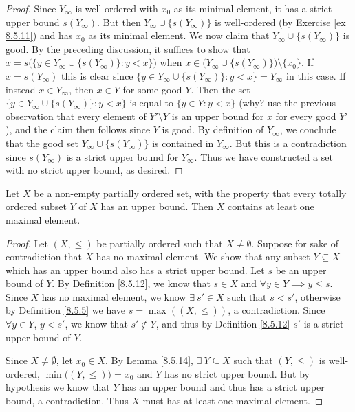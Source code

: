 \begin{proof}
    Since \(Y_{\infty}\) is well-ordered with \(x_0\) as its minimal element, it has a strict upper bound \(s(Y_{\infty})\).
    But then \(Y_{\infty} \cup \{s(Y_{\infty})\}\) is well-ordered (by Exercise \ref{ex 8.5.11}) and has \(x_0\) as its minimal element.
    We now claim that \(Y_{\infty} \cup \{s(Y_{\infty})\}\) is good.
    By the preceding discussion, it suffices to show that \(x = s\big(\big\{y \in Y_{\infty} \cup \{s(Y_{\infty})\} : y < x\big\}\big)\) when \(x \in \big(Y_{\infty} \cup \{s(Y_{\infty})\}\big) \setminus \{x_0\}\).
    If \(x = s(Y_{\infty})\) this is clear since \(\big\{y \in Y_{\infty} \cup \{s(Y_{\infty})\} : y < x\big\} = Y_{\infty}\) in this case.
    If instead \(x \in Y_{\infty}\), then \(x \in Y\) for some good \(Y\).
    Then the set \(\big\{y \in Y_{\infty} \cup \{s(Y_{\infty})\}: y < x\big\}\) is equal to \(\{y \in Y : y < x\}\)
    (why? use the previous observation that every element of \(Y' \setminus Y\) is an upper bound for \(x\) for every good \(Y'\)), and the claim then follows since \(Y\) is good.
    By definition of \(Y_{\infty}\), we conclude that the good set \(Y_{\infty} \cup \{s(Y_{\infty})\}\) is contained in \(Y_{\infty}\).
    But this is a contradiction since \(s(Y_{\infty})\) is a strict upper bound for \(Y_{\infty}\).
    Thus we have constructed a set with no strict upper bound, as desired.
\end{proof}

\begin{lemma}\label{8.5.15}
    Let \(X\) be a non-empty partially ordered set, with the property that every totally ordered subset \(Y\) of \(X\) has an upper bound.
    Then \(X\) contains at least one maximal element.
\end{lemma}

\begin{proof}
    Let \((X, \leq)\) be partially ordered such that \(X \neq \emptyset\).
    Suppose for sake of contradiction that \(X\) has no maximal element.
    We show that any subset \(Y \subseteq X\) which has an upper bound also has a strict upper bound.
    Let \(s\) be an upper bound of \(Y\).
    By Definition \ref{8.5.12}, we know that \(s \in X\) and \(\forall y \in Y \implies y \leq s\).
    Since \(X\) has no maximal element, we know \(\exists\ s' \in X\) such that \(s < s'\), otherwise by Definition \ref{8.5.5} we have \(s = \max((X, \leq))\), a contradiction.
    Since \(\forall y \in Y\), \(y < s'\), we know that \(s' \notin Y\), and thus by Definition \ref{8.5.12} \(s'\) is a strict upper bound of \(Y\).

    Since \(X \neq \emptyset\), let \(x_0 \in X\).
    By Lemma \ref{8.5.14}, \(\exists\ Y \subseteq X\) such that \((Y, \leq)\) is well-ordered, \(\min\big((Y, \leq)\big) = x_0\) and \(Y\) has no strict upper bound.
    But by hypothesis we know that \(Y\) has an upper bound and thus has a strict upper bound, a contradiction.
    Thus \(X\) must has at least one maximal element.
\end{proof}

